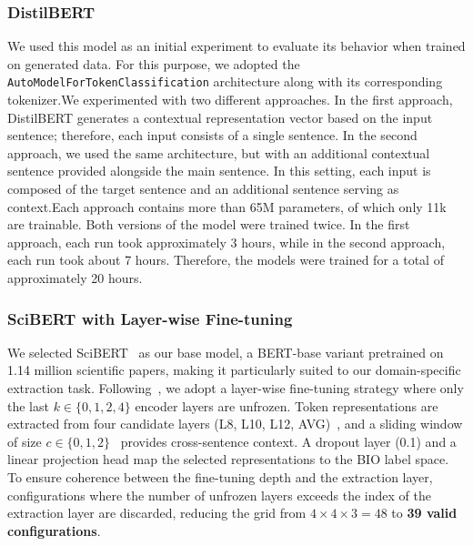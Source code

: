 \documentclass{article}
\theoremstyle{plain}
\theoremstyle{definition}
\theoremstyle{remark}
\begin{document}
\subsubsection{DistilBERT}
We used this model as an initial experiment to evaluate its behavior when trained on generated data. For this purpose, we adopted the \texttt{AutoModelForTokenClassification} architecture along with its corresponding tokenizer.We experimented with two different approaches. In the first approach, DistilBERT\cite{sanh2019distilbert} generates a contextual representation vector based on the input sentence; therefore, each input consists of a single sentence. In the second approach, we used the same architecture, but with an additional contextual sentence provided alongside the main sentence. In this setting, each input is composed of the target sentence and an additional sentence serving as context.Each approach contains more than 65M parameters, of which only 11k are trainable. Both versions of the model were trained twice. In the first approach, each run took approximately 3 hours, while in the second approach, each run took about 7 hours. Therefore, the models were trained for a total of approximately 20 hours.

\subsubsection{SciBERT with Layer-wise Fine-tuning}
We selected SciBERT~\cite{DBLP:journals/corr/abs-1903-10676} as our base model, a BERT-base variant pretrained on 1.14 million scientific papers, making it particularly suited to our domain-specific extraction task. Following~\cite{jawahar2019bert}, we adopt a layer-wise fine-tuning strategy where only the last $k \in \{0, 1, 2, 4\}$ encoder layers are unfrozen. Token representations are extracted from four candidate layers (L8, L10, L12, AVG)~\cite{devlin2019bert}, and a sliding window of size $c \in \{0, 1, 2\}$~\cite{luoma2020crosssentence} provides cross-sentence context. A dropout layer (0.1) and a linear projection head map the selected representations to the BIO label space. To ensure coherence between the fine-tuning depth and the extraction layer, configurations where the number of unfrozen layers exceeds the index of the extraction layer are discarded, reducing the grid from $4 \times 4 \times 3 = 48$ to \textbf{39 valid configurations}.
\end{document}
